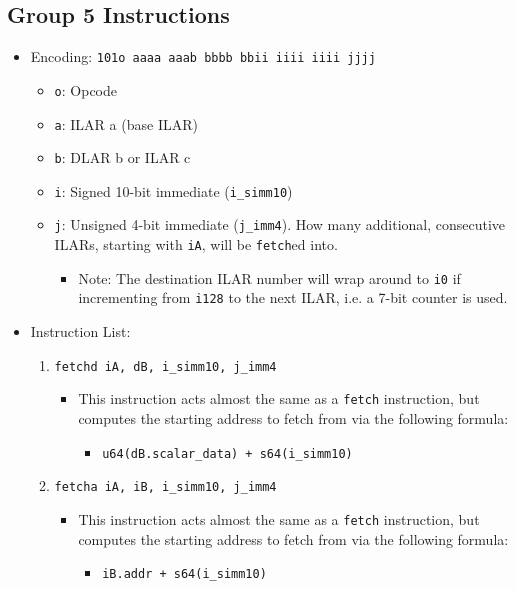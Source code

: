 \documentclass{article}
\begin{document}
	\subsection{Group 5 Instructions}
		\begin{itemize}
		\item Encoding:  \texttt{101o aaaa aaab bbbb  bbii iiii iiii jjjj}
			\begin{itemize}
			\item \texttt{o}:  Opcode
			\item \texttt{a}:  ILAR a (base ILAR)
			\item \texttt{b}:  DLAR b or ILAR c
			\item \texttt{i}:  Signed 10-bit immediate (\texttt{i\_simm10})
			\item \texttt{j}:  Unsigned 4-bit immediate (\texttt{j\_imm4}).
				How many additional, consecutive ILARs, starting with
				\texttt{iA}, will be \texttt{fetch}ed into.
				\begin{itemize}
				\item Note:  The destination ILAR number will wrap around
					to \texttt{i0} if incrementing from \texttt{i128} to
					the next ILAR, i.e. a 7-bit counter is used.
				\end{itemize}
			\end{itemize}
		\item Instruction List:
			\begin{enumerate}
			\item \texttt{fetchd iA, dB, i\_simm10, j\_imm4}
				\begin{itemize}
				\item This instruction acts almost the same as a
					\texttt{fetch} instruction, but computes the starting
					address to fetch from via the following formula:
					\begin{itemize}
					\item \texttt{u64(dB.scalar\_data) + s64(i\_simm10)}
					\end{itemize}
				\end{itemize}
			\item \texttt{fetcha iA, iB, i\_simm10, j\_imm4}
				\begin{itemize}
				\item This instruction acts almost the same as a
					\texttt{fetch} instruction, but computes the starting
					address to fetch from via the following formula:
					\begin{itemize}
					\item \texttt{iB.addr + s64(i\_simm10)}
					\end{itemize}
				\end{itemize}
			\end{enumerate}
		\end{itemize}
\end{document}
